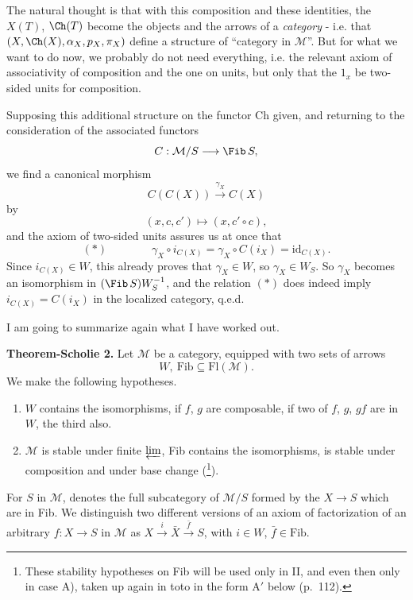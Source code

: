 
The natural thought is that with this composition and these identities, the $X(T)$, $\Ch(T)$ become the objects and the arrows of a \textit{category} - i.e. that $(X,\Ch(X),\alpha_X,p_X,\pi_X)$ define a structure of ``category in $\mathcal{M}$''. But for what we want to do now, we probably do not need everything, i.e.
the relevant axiom of associativity of composition and the one on units, but only that the $1_x$ be two-sided units for composition.

Supposing this additional structure on the functor Ch given, and returning to the consideration of the associated functors %
\[
C : \mathcal{M}/S\longrightarrow\Fib\,S,
\]
we find a canonical morphism
\[
C(C(X))\xrightarrow{\gamma_X}C(X)
\]
by
\[
(x,c,c')\longmapsto(x,c'\circ c),
\]
and the axiom of two-sided units assures us at once that
\[
(\ast)\qquad\qquad\gamma_X\circ i_{C(X)}=\gamma_X\circ C(i_X)=\mathrm{id}_{C(X)}.
\]
Since $i_{C(X)}\in W$, this already proves that $\gamma_X\in W$, so $\gamma_X\in W_S$. So $\gamma_X$ becomes an isomorphism in $(\Fib\,S)W_S^{-1}$, and the relation $(\ast)$ does indeed imply $i_{C(X)}=C(i_X)$ in the localized category, q.e.d.

I am going to summarize again what I have worked out.

\textbf{Theorem-Scholie 2.} Let $\mathcal{M}$ be a category, equipped with two sets of arrows
\[
W,\ \mathrm{Fib}\subseteq\mathrm{Fl}(\mathcal{M}).
\]
We make the following hypotheses.

\begin{enumerate}[label={}]
\item[$1^o$] $W$ contains the isomorphisms, if $f$, $g$ are composable, if two of $f$, $g$, $gf$ are in $W$, the third also.
\item[$2^o$] $\mathcal{M}$ is stable under finite $\varprojlim$, Fib contains the isomorphisms, is stable under composition and under base change (\footnote[59]{These stability hypotheses on Fib will be used only in II, and even then only in case A), taken up again in toto in the form A$'$ below (p.~112).}).
\end{enumerate}

For $S$ in $\mathcal{M}$,  denotes the full subcategory of $\mathcal{M}/S$ formed by the $X\longrightarrow S$ which are in Fib. We distinguish two different versions of an axiom of factorization of an arbitrary $f : X\longrightarrow S$ in $\mathcal{M}$ as $X\xrightarrow{i}\bar X\xrightarrow{\bar f}S$, with $i\in W$, $\bar f\in\mathrm{Fib}$.


